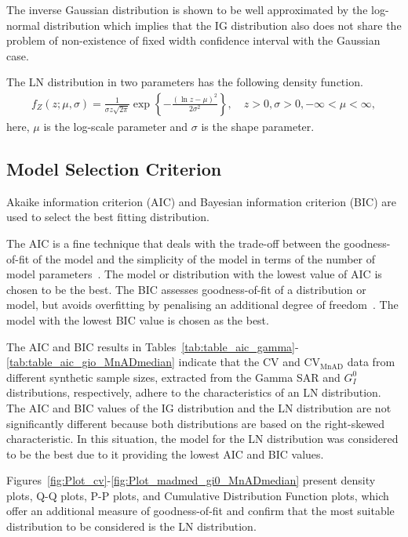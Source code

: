 \documentclass[remotesensing,article,submit,moreauthors,pdftex]{Definitions/mdpi}
\begin{document}
The inverse Gaussian distribution is shown to be well approximated by
the log-normal distribution \cite{whitmore1978} which implies that the
IG distribution also does not share the problem of non-existence of
fixed width confidence interval with the Gaussian case.

The LN distribution in two parameters has the following density
function. \begin{align}
    f_Z(z;\mu, \sigma )=\frac{1}{\sigma z\sqrt{2\pi}}\exp\left\{-\frac{(\ln z- \mu)^2}{2\sigma^2}\right\}, \quad z>0, \sigma>0, -\infty < \mu < \infty,
\end{align} here, \(\mu\) is the log-scale parameter and \(\sigma\) is
the shape parameter.

\hypertarget{model-selection-criterion}{%
\subsection{Model Selection Criterion}\label{model-selection-criterion}}

Akaike information criterion (AIC) and Bayesian information criterion
(BIC) are used to select the best fitting distribution.

The AIC is a fine technique that deals with the trade-off between the
goodness-of-fit of the model and the simplicity of the model in terms of
the number of model parameters~\cite{Burnham2004}. The model or
distribution with the lowest value of AIC is chosen to be the best. The
BIC assesses goodness-of-fit of a distribution or model, but avoids
overfitting by penalising an additional degree of
freedom~\cite{Dziak2019}. The model with the lowest BIC value is chosen
as the best.

The AIC and BIC results in
Tables~\ref{tab:table_aic_gamma}-\ref{tab:table_aic_gio_MnADmedian}
indicate that the CV and \(\text{CV}_{\text{MnAD}}\) data from different
synthetic sample sizes, extracted from the Gamma SAR and \(G_I^0\)
distributions, respectively, adhere to the characteristics of an LN
distribution. The AIC and BIC values of the IG distribution and the LN
distribution are not significantly different because both distributions
are based on the right-skewed characteristic. In this situation, the
model for the LN distribution was considered to be the best due to it
providing the lowest AIC and BIC values.

Figures~\ref{fig:Plot_cv}-\ref{fig:Plot_madmed_gi0_MnADmedian} present
density plots, Q-Q plots, P-P plots, and Cumulative Distribution
Function plots, which offer an additional measure of goodness-of-fit and
confirm that the most suitable distribution to be considered is the LN
distribution.
\end{document}
